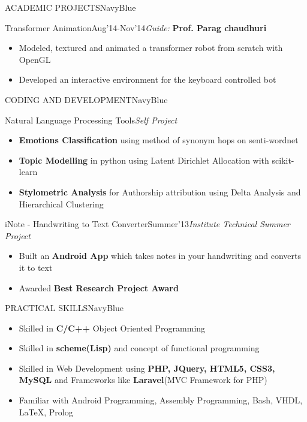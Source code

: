 \documentclass[11pt]{book} %
\begin{document}
\begin{ressection}{ACADEMIC PROJECTS}{NavyBlue}
\begin{ressubsection}{Transformer Animation}{Aug'14-Nov'14}{\textit{Guide:} \textbf{Prof. Parag chaudhuri}}
\begin{itemize}
\itemsep-0.1em
\item Modeled, textured and animated a transformer robot from scratch with OpenGL
\item Developed an interactive environment for the keyboard controlled bot
\end{itemize}
\end{ressubsection}

\end{ressection}


\begin{ressection}{CODING AND DEVELOPMENT}{NavyBlue}

\begin{ressubsection}{Natural Language Processing Tools}{}{\textit{Self Project}}
\begin{itemize}
\itemsep-0.1em
\item \textbf{Emotions Classification} using method of synonym hops on senti-wordnet
\item \textbf{Topic Modelling} in python using Latent Dirichlet Allocation with scikit-learn
\item \textbf{Stylometric Analysis} for Authorship attribution using Delta Analysis and Hierarchical Clustering
\end{itemize}
\end{ressubsection}

\begin{ressubsection}{iNote - Handwriting to Text Converter}{Summer'13}{\textit{Institute Technical Summer Project}}
\begin{itemize}
\itemsep-0.1em
\item Built an \textbf{Android App} which takes notes in your handwriting and converts it to text
\item Awarded \textbf{Best Research Project Award}
\end{itemize}
\end{ressubsection}
  
\end{ressection}

\begin{ressection}{PRACTICAL SKILLS}{NavyBlue}

\begin{itemize}
\itemsep 0.1em
\item Skilled in \textbf{C/C++} Object Oriented Programming
\item Skilled in \textbf{scheme(Lisp)} and concept of functional programming
\item Skilled in Web Development using \textbf{PHP, JQuery, HTML5, CSS3, MySQL} and Frameworks like \textbf{Laravel}(MVC Framework for PHP)
\item Familiar with Android Programming, Assembly Programming, Bash, VHDL, \LaTeX, Prolog
\end{itemize}

\end{ressection}
\end{document}

